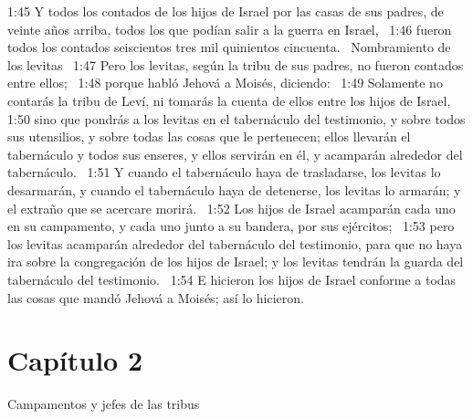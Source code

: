1:45 Y todos los contados de los hijos de Israel por las casas de sus padres, de veinte años arriba, todos los que podían salir a la guerra en Israel,  
1:46 fueron todos los contados seiscientos tres mil quinientos cincuenta.  
Nombramiento de los levitas  
1:47 Pero los levitas, según la tribu de sus padres, no fueron contados entre ellos;  
1:48 porque habló Jehová a Moisés, diciendo:  
1:49 Solamente no contarás la tribu de Leví, ni tomarás la cuenta de ellos entre los hijos de Israel,  
1:50 sino que pondrás a los levitas en el tabernáculo del testimonio, y sobre todos sus utensilios, y sobre todas las cosas que le pertenecen; ellos llevarán el tabernáculo y todos sus enseres, y ellos servirán en él, y acamparán alrededor del tabernáculo.  
1:51 Y cuando el tabernáculo haya de trasladarse, los levitas lo desarmarán, y cuando el tabernáculo haya de detenerse, los levitas lo armarán; y el extraño que se acercare morirá.  
1:52 Los hijos de Israel acamparán cada uno en su campamento, y cada uno junto a su bandera, por sus ejércitos;  
1:53 pero los levitas acamparán alrededor del tabernáculo del testimonio, para que no haya ira sobre la congregación de los hijos de Israel; y los levitas tendrán la guarda del tabernáculo del testimonio.  
1:54 E hicieron los hijos de Israel conforme a todas las cosas que mandó Jehová a Moisés; así lo hicieron.  
\section*{Capítulo 2 }
Campamentos y jefes de las tribus  

